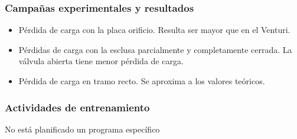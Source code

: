 \documentclass{article}
\begin{document}
\subsubsection*{Campañas experimentales y resultados}
\begin{itemize}
    \item Pérdida de carga con la placa orificio. Resulta ser mayor que en el Venturi.
    \item Pérdidas de carga con la esclusa parcialmente y completamente cerrada. La válvula abierta tiene menor pérdida de carga.
    \item Pérdida de carga en tramo recto. Se aproxima a los valores teóricos.
\end{itemize}

\subsubsection*{Actividades de entrenamiento}
No está planificado un programa específico
\end{document}
